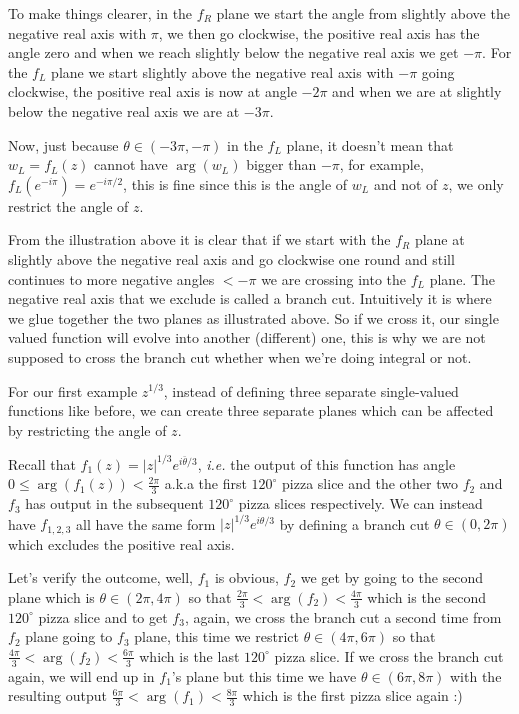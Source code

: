\documentclass[aps,preprint,preprintnumbers,nofootinbib,showpacs,prd]{revtex4-1}
\newcommand{\ie}{{\it i.e.} }
\begin{document}
To make things clearer, in the $f_R$ plane we start the angle from slightly above the negative real axis with $\pi$, we then go clockwise, the positive real axis has the angle zero and when we reach slightly below the negative real axis we get $-\pi$. For the $f_L$ plane we start slightly above the negative real axis with $-\pi$ going clockwise, the positive real axis is now at angle $-2\pi$ and when we are at slightly below the negative real axis we are at $-3\pi$.

Now, just because $\theta \in (-3\pi, -\pi)$ in the $f_L$ plane, it doesn't mean that $w_L = f_L(z)$ cannot have $\arg(w_L)$ bigger than $-\pi$, for example, $f_L(e^{-i\pi}) = e^{-i\pi/2}$, this is fine since this is the angle of $w_L$ and not of $z$, we only restrict the angle of $z$.

From the illustration above it is clear that if we start with the $f_R$ plane at slightly above the negative real axis and go clockwise one round and still continues to more negative angles $< -\pi$ we are crossing into the $f_L$ plane. The negative real axis that we exclude is called a branch cut. Intuitively it is where we glue together the two planes as illustrated above. So if we cross it, our single valued function will evolve into another (different) one, this is why we are not supposed to cross the branch cut whether when we're doing integral or not.

For our first example $z^{1/3}$, instead of defining three separate single-valued functions like before, we can create three separate planes which can be affected by restricting the angle of $z$.

Recall that $f_1(z) = |z|^{1/3}e^{i\bar\theta/3}$, \ie the output of this function has angle $0 \le \arg(f_1(z)) < \frac{2\pi}{3}$ a.k.a the first $120^\circ$ pizza slice and the other two $f_2$ and $f_3$ has output in the subsequent $120^\circ$ pizza slices respectively. We can instead have $f_{1,2,3}$ all have the same form $|z|^{1/3} e^{i\theta/3}$ by defining a branch cut $\theta \in (0, 2\pi)$ which excludes the positive real axis.

Let's verify the outcome, well, $f_1$ is obvious, $f_2$ we get by going to the second plane which is $\theta \in (2\pi, 4\pi)$ so that $\frac{2\pi}{3} < \arg(f_2) < \frac{4\pi}{3}$ which is the second $120^\circ$ pizza slice and to get $f_3$, again, we cross the branch cut a second time from $f_2$ plane going to $f_3$ plane, this time we restrict $\theta \in (4\pi, 6\pi)$ so that $\frac{4\pi}{3} < \arg(f_2) < \frac{6\pi}{3}$ which is the last $120^\circ$ pizza slice. If we cross the branch cut again, we will end up in $f_1$'s plane but this time we have $\theta \in (6\pi, 8\pi)$ with the resulting output $\frac{6\pi}{3} < \arg(f_1) < \frac{8\pi}{3}$ which is the first pizza slice again :)
\end{document}
